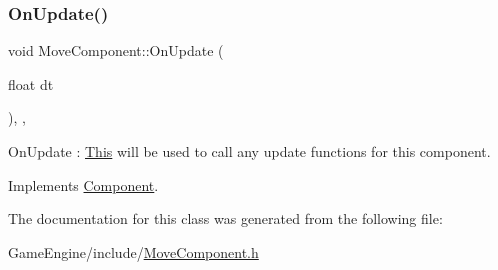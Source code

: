 \subsubsection{\texorpdfstring{On\+Update()}{OnUpdate()}}
{\footnotesize\ttfamily void Move\+Component\+::\+On\+Update (\begin{DoxyParamCaption}\item[{float}]{dt }\end{DoxyParamCaption})\hspace{0.3cm}{\ttfamily [inline]}, {\ttfamily [override]}, {\ttfamily [virtual]}}

On\+Update \+: \mbox{\hyperlink{class_this}{This}} will be used to call any update functions for this component. 

Implements \mbox{\hyperlink{class_component_ab71d7f4b6d8792287a9b0c9e045acbe0}{Component}}.



The documentation for this class was generated from the following file\+:\begin{DoxyCompactItemize}
\item 
Game\+Engine/include/\mbox{\hyperlink{_move_component_8h}{Move\+Component.\+h}}\end{DoxyCompactItemize}

